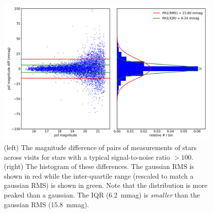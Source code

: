 \documentclass[twocolumn]{aastex62}
\begin{document}
\begin{figure}
\centering
\includegraphics[width=0.9\columnwidth]{DC1-imsim-dithered_r_PA1.png}
\caption{(left) The magnitude difference of pairs of measurements of stars across visits for stars with a typical signal-to-noise ratio $>100$.  (right) The histogram of these differences.  The gaussian RMS is shown in red while the inter-quartile range (rescaled to match a gaussian RMS) is shown in green.  Note that the distribution is more peaked than a gaussian.  The IQR (6.2~mmag) is {\em smaller} than the gaussian RMS (15.8~mmag).}
\label{fig:validate_drp_PA1}
\end{figure}
\end{document}
